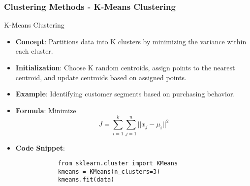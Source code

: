 \documentclass[aspectratio=169]{beamer}
\begin{document}
\begin{frame}[fragile]
    \frametitle{Clustering Methods - K-Means Clustering}
    \begin{block}{K-Means Clustering}
        \begin{itemize}
            \item \textbf{Concept}: Partitions data into K clusters by minimizing the variance within each cluster.
            \item \textbf{Initialization}: Choose K random centroids, assign points to the nearest centroid, and update centroids based on assigned points.
            \item \textbf{Example}: Identifying customer segments based on purchasing behavior.
            \item \textbf{Formula}: Minimize 
            \begin{equation}
                J = \sum_{i=1}^{k} \sum_{j=1}^{n} ||x_j - \mu_i||^2
            \end{equation}
            \item \textbf{Code Snippet}:
            \begin{lstlisting}
            from sklearn.cluster import KMeans
            kmeans = KMeans(n_clusters=3)
            kmeans.fit(data)
            \end{lstlisting}
        \end{itemize}
    \end{block}
\end{frame}
\end{document}
